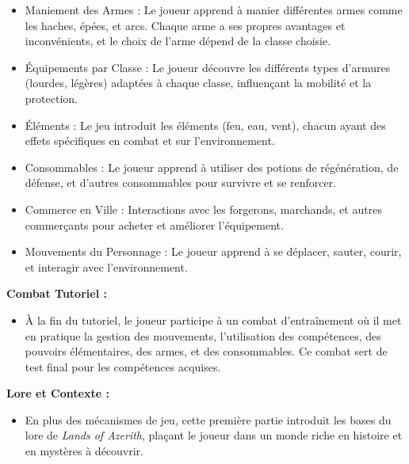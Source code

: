 \begin{itemize}
    \item Maniement des Armes : Le joueur apprend à manier différentes armes comme les haches, épées, et arcs.
          Chaque arme a ses propres avantages et inconvénients, et le choix de l'arme dépend de la classe choisie.
          \\

    \item Équipements par Classe : Le joueur découvre les différents types d'armures (lourdes, légères) adaptées à chaque classe, influençant la mobilité et la protection.
          \\

    \item Éléments : Le jeu introduit les éléments (feu, eau, vent), chacun ayant des effets spécifiques en combat et sur l'environnement.
          \\

    \item Consommables : Le joueur apprend à utiliser des potions de régénération, de défense, et d'autres consommables pour survivre et se renforcer.
          \\

    \item Commerce en Ville : Interactions avec les forgerons, marchands, et autres commerçants pour acheter et améliorer l'équipement.
          \\

    \item Mouvements du Personnage : Le joueur apprend à se déplacer, sauter, courir, et interagir avec l'environnement.
          \\
\end{itemize}

\textbf{Combat Tutoriel :}

\begin{itemize}
    \item À la fin du tutoriel, le joueur participe à un combat d'entraînement où il met en pratique la gestion des mouvements, l'utilisation des compétences, des pouvoirs élémentaires, des armes, et des consommables.
          Ce combat sert de test final pour les compétences acquises.
          \\
\end{itemize}

\textbf{Lore et Contexte :}

\begin{itemize}
    \item En plus des mécanismes de jeu, cette première partie introduit les bases du lore de \textit{Lands of Azerith}, plaçant le joueur dans un monde riche en histoire et en mystères à découvrir.
\end{itemize}


